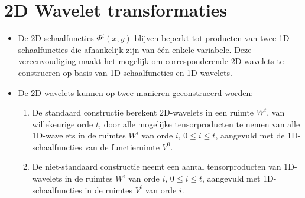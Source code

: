 \section{2D Wavelet transformaties }
\begin{enumerate}
	{
		\begin{itemize} 
			\item De 2D-schaalfuncties $\Phi^t(x, y)$ blijven beperkt tot producten van twee 1D-schaalfuncties die afhankelijk zijn van één enkele variabele. Deze vereenvoudiging maakt het mogelijk om corresponderende 2D-wavelets te construeren op basis van 1D-schaalfuncties en 1D-wavelets.
			\item De 2D-wavelets kunnen op twee manieren geconstrueerd worden:
			\begin{enumerate}
				\item De standaard constructie berekent 2D-wavelets in een ruimte $W^t$, van willekeurige orde $t$, door alle mogelijke tensorproducten te nemen van alle 1D-wavelets in de ruimtes $W^i$ van orde $i$, $0 \leq i \leq t$, aangevuld met de 1D-schaalfuncties van de functieruimte $V^0$.
		
				\item De niet-standaard constructie neemt een aantal tensorproducten van 1D-wavelets in de ruimtes $W^i$ van orde $i$, $0\leq i\leq t$, aangevuld met 1D-schaalfuncties in de ruimtes $V^i$ van orde $i$.
			\end{enumerate}
		\end{itemize}
	}
			

\end{enumerate}
